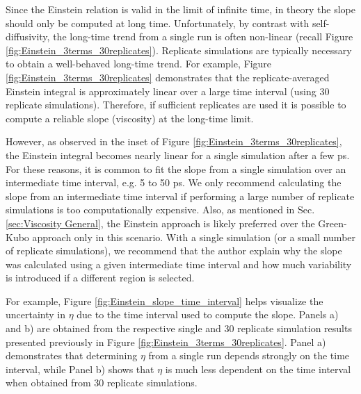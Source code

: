 \documentclass[9pt,bestpractices]{livecoms}
\begin{document}
Since the Einstein relation is valid in the limit of infinite time, in theory the slope should only be computed at long time. Unfortunately, by contrast with self-diffusivity, the long-time trend from a single run is often non-linear (recall Figure \ref{fig:Einstein_3terms_30replicates}). Replicate simulations are typically necessary to obtain a well-behaved long-time trend. For example, Figure \ref{fig:Einstein_3terms_30replicates} demonstrates that the replicate-averaged Einstein integral is approximately linear over a large time interval (using 30 replicate simulations). Therefore, if sufficient replicates are used it is possible to compute a reliable slope (viscosity) at the long-time limit.

However, as observed in the inset of Figure \ref{fig:Einstein_3terms_30replicates}, the Einstein integral becomes nearly linear for a single simulation after a few ps. For these reasons, it is common to fit the slope from a single simulation over an intermediate time interval, e.g. 5 to 50 ps. We only recommend calculating the slope from an intermediate time interval if performing a large number of replicate simulations is too computationally expensive. Also, as mentioned in Sec. \ref{sec:Viscosity General}, the Einstein approach is likely preferred over the Green-Kubo approach only in this scenario. With a single simulation (or a small number of replicate simulations), we recommend that the author explain why the slope was calculated using a given intermediate time interval and how much variability is introduced if a different region is selected. 

For example, Figure \ref{fig:Einstein_slope_time_interval} helps visualize the uncertainty in $\eta$ due to the time interval used to compute the slope. Panels a) and b) are obtained from the respective single and 30 replicate simulation results presented previously in Figure \ref{fig:Einstein_3terms_30replicates}. Panel a) demonstrates that determining $\eta$ from a single run depends strongly on the time interval, while Panel b) shows that $\eta$ is much less dependent on the time interval when obtained from 30 replicate simulations.
\end{document}
